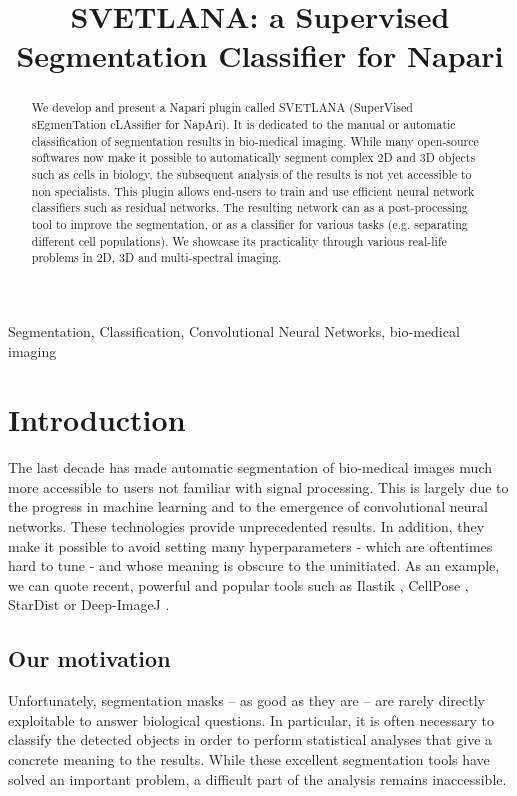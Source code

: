 \documentclass{article}
\title{SVETLANA: a Supervised Segmentation Classifier for Napari}
\begin{document}
%
\maketitle
%
\begin{abstract}
We develop and present a Napari plugin called SVETLANA (SuperVised sEgmenTation cLAssifier for NapAri). It is dedicated to the manual or automatic classification of segmentation results in bio-medical imaging.
While many open-source softwares now make it possible to automatically segment complex 2D and 3D objects such as cells in biology, the subsequent analysis of the results is not yet accessible to non specialists. 
This plugin allows end-users to train and use efficient neural network classifiers such as residual networks. 
The resulting network can as a post-processing tool to improve the segmentation, or as a classifier for various tasks (e.g. separating different cell populations).
We showcase its practicality through various real-life problems in 2D, 3D and multi-spectral imaging.
\end{abstract}
%
\begin{keywords}
Segmentation, Classification, Convolutional Neural Networks, bio-medical imaging
\end{keywords}
%
\section{Introduction}
\label{sec:intro}

The last decade has made automatic segmentation of bio-medical images much more accessible to users not familiar with signal processing. 
This is largely due to the progress in machine learning and to the emergence of convolutional neural networks. These technologies provide unprecedented results. In addition, they make it possible to avoid setting many hyperparameters - which are oftentimes hard to tune - and whose meaning is obscure to the uninitiated. 
As an example, we can quote recent, powerful and popular tools such as Ilastik \cite{berg2019ilastik}, CellPose \cite{stringer2021cellpose}, StarDist \cite{fazeli2020automated} or Deep-ImageJ \cite{gomez2021deepimagej}. 

\subsection{Our motivation}

Unfortunately, segmentation masks -- as good as they are -- are rarely directly exploitable to answer biological questions. In particular, it is often necessary to classify the detected objects in order to perform statistical analyses that give a concrete meaning to the results. 
While these excellent segmentation tools have solved an important problem, a difficult part of the analysis remains inaccessible.
\end{document}
